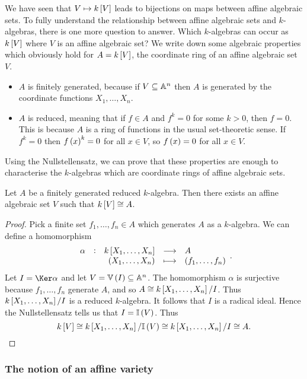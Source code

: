 
We have seen that $ V \mapsto k\sbr{V} $ leads to bijections on maps between affine algebraic sets. To fully understand the relationship between affine algebraic sets and $ k $-algebras, there is one more question to answer. Which $ k $-algebras can occur as $ k\sbr{V} $ where $ V $ is an affine algebraic set? We write down some algebraic properties which obviously hold for $ A = k\sbr{V} $, the coordinate ring of an affine algebraic set $ V $.
\begin{itemize}
\item $ A $ is finitely generated, because if $ V \subseteq \AA^n $ then $ A $ is generated by the coordinate functions $ X_1, \dots, X_n $.
\item $ A $ is reduced, meaning that if $ f \in A $ and $ f^k = 0 $ for some $ k > 0 $, then $ f = 0 $. This is because $ A $ is a ring of functions in the usual set-theoretic sense. If $ f^k = 0 $ then $ f\br{x}^k = 0 $ for all $ x \in V $, so $ f\br{x} = 0 $ for all $ x \in V $.
\end{itemize}
Using the Nullstellensatz, we can prove that these properties are enough to characterise the $ k $-algebras which are coordinate rings of affine algebraic sets.

\begin{proposition}
\label{prop:kva}
Let $ A $ be a finitely generated reduced $ k $-algebra. Then there exists an affine algebraic set $ V $ such that $ k\sbr{V} \cong A $.
\end{proposition}

\begin{proof}
Pick a finite set $ f_1, \dots, f_n \in A $ which generates $ A $ as a $ k $-algebra. We can define a homomorphism
$$ \function[\alpha]{k\sbr{X_1, \dots, X_n}}{A}{\br{X_1, \dots, X_n}}{\br{f_1, \dots, f_n}}. $$
Let $ I = \Ker \alpha $ and let $ V = \VV\br{I} \subseteq \AA^n $. The homomorphism $ \alpha $ is surjective because $ f_1, \dots, f_n $ generate $ A $, and so $ A \cong k\sbr{X_1, \dots, X_n} / I $. Thus $ k\sbr{X_1, \dots, X_n} / I $ is a reduced $ k $-algebra. It follows that $ I $ is a radical ideal. Hence the Nullstellensatz tells us that $ I = \II\br{V} $. Thus
$$ k\sbr{V} \cong k\sbr{X_1, \dots, X_n} / \II\br{V} \cong k\sbr{X_1, \dots, X_n} / I \cong A. $$
\end{proof}

\pagebreak

\subsubsection{The notion of an affine variety}

